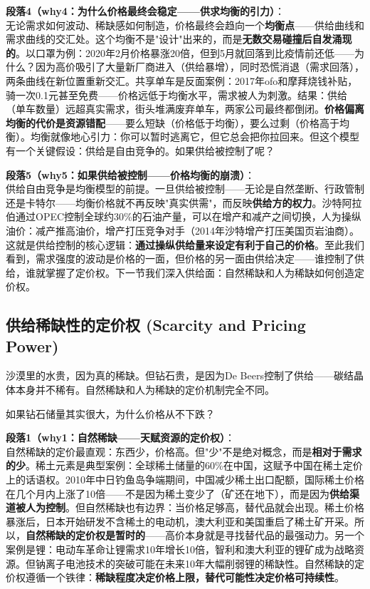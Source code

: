 \documentclass[../main.tex]{subfiles}
\begin{document}
	\textbf{段落4（why4：为什么价格最终会稳定——供求均衡的引力）}：\\
	无论需求如何波动、稀缺感如何制造，价格最终会趋向一个\textbf{均衡点}——供给曲线和需求曲线的交汇处。这个均衡不是"设计"出来的，而是\textbf{无数交易碰撞后自发涌现的}。以口罩为例：2020年2月价格暴涨20倍，但到5月就回落到比疫情前还低——为什么？因为高价吸引了大量新厂商进入（供给暴增），同时恐慌消退（需求回落），两条曲线在新位置重新交汇。共享单车是反面案例：2017年ofo和摩拜烧钱补贴，骑一次0.1元甚至免费——价格远低于均衡水平，需求被人为刺激。结果：供给（单车数量）远超真实需求，街头堆满废弃单车，两家公司最终都倒闭。\textbf{价格偏离均衡的代价是资源错配}——要么短缺（价格低于均衡），要么过剩（价格高于均衡）。均衡就像地心引力：你可以暂时逃离它，但它总会把你拉回来。但这个模型有一个关键假设：供给是自由竞争的。如果供给被控制了呢？

	\textbf{段落5（why5：如果供给被控制——价格均衡的崩溃）}：\\
	供给自由竞争是均衡模型的前提。一旦供给被控制——无论是自然垄断、行政管制还是卡特尔——均衡价格就不再反映"真实供需"，而反映\textbf{供给方的权力}。沙特阿拉伯通过OPEC控制全球约30\%的石油产量，可以在增产和减产之间切换，人为操纵油价：减产推高油价，增产打压竞争对手（2014年沙特增产打压美国页岩油商）。这就是供给控制的核心逻辑：\textbf{通过操纵供给量来设定有利于自己的价格}。至此我们看到，需求强度的波动是价格的一面，但价格的另一面由供给决定——谁控制了供给，谁就掌握了定价权。下一节我们深入供给面：自然稀缺和人为稀缺如何创造定价权。

	\subsection{供给稀缺性的定价权 (Scarcity and Pricing Power)}
	\begin{motivation}
		沙漠里的水贵，因为真的稀缺。但钻石贵，是因为De Beers控制了供给——碳结晶体本身并不稀有。自然稀缺和人为稀缺的定价机制完全不同。
	\end{motivation}
	\begin{questionbox}
		如果钻石储量其实很大，为什么价格从不下跌？
	\end{questionbox}

	\textbf{段落1（why1：自然稀缺——天赋资源的定价权）}：\\
	自然稀缺的定价最直观：东西少，价格高。但"少"不是绝对概念，而是\textbf{相对于需求的少}。稀土元素是典型案例：全球稀土储量的60\%在中国，这赋予中国在稀土定价上的话语权。2010年中日钓鱼岛争端期间，中国减少稀土出口配额，国际稀土价格在几个月内上涨了10倍——不是因为稀土变少了（矿还在地下），而是因为\textbf{供给渠道被人为控制}。但自然稀缺也有边界：当价格足够高，替代品就会出现。稀土价格暴涨后，日本开始研发不含稀土的电动机，澳大利亚和美国重启了稀土矿开采。所以，\textbf{自然稀缺的定价权是暂时的}——高价本身就是寻找替代品的最强动力。另一个案例是锂：电动车革命让锂需求10年增长10倍，智利和澳大利亚的锂矿成为战略资源。但钠离子电池技术的突破可能在未来10年大幅削弱锂的稀缺性。自然稀缺的定价权遵循一个铁律：\textbf{稀缺程度决定价格上限，替代可能性决定价格可持续性}。
\end{document}
